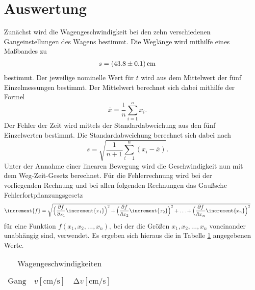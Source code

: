 \section{Auswertung}
\label{sec:Auswertung}

Zunächst wird die Wagengeschwindigkeit bei den zehn verschiedenen Gangeinstellungen des Wagens bestimmt.
Die Weglänge wird mithilfe eines Maßbandes zu
\begin{align*}
  s = \SI{43.8 +- 0.1}{\centi\metre}
\end{align*}
bestimmt.
Der jeweilige nominelle Wert für $t$ wird aus dem Mittelwert der fünf Einzelmessungen bestimmt.
Der Mittelwert berechnet sich dabei mithilfe der Formel
\begin{equation}
 \bar{x} = \frac{1}{n} \sum_{i=1}^n x_i.
\end{equation}
Der Fehler der Zeit wird mittels der Standardabweichung aus den fünf Einzelwerten bestimmt.
Die Standardabweichung berechnet sich dabei nach
\begin{equation}
  s = \sqrt{\frac{1}{n+1} \sum_{i=1}^n (x_i - \bar{x}) }.
\end{equation}
Unter der Annahme einer linearen Bewegung wird die Geschwindigkeit nun mit dem Weg-Zeit-Gesetz berechnet.
Für die Fehlerrechnung wird bei der vorliegenden Rechnung und bei allen folgenden Rechnungen das Gaußsche Fehlerfortpflanzungsgesetz
\begin{equation}
\increment{f} = \sqrt{\Bigl(\frac{\partial f}{\partial x_1}\increment{x_1}\Bigr)^2 + \Bigl(\frac{\partial f}{\partial x_2}\increment{x_2}\Bigr)^2 + \dotsc + \Bigl(\frac{\partial f}{\partial x_n}\increment{x_n}\Bigr)^2}
\end{equation}
für eine Funktion $f(x_1,x_2, \dotsc ,x_n)$, bei der die Größen $x_1, x_2, \dotsc , x_n$ voneinander unabhängig sind, verwendet.
Es ergeben sich hieraus die in Tabelle \ref{tab:Geschwindigkeiten} angegebenen Werte.

\begin{table}[H]
  \centering
  \caption{Wagengeschwindigkeiten}
  \label{tab:Geschwindigkeiten}
  \begin{tabular}{c c c}
    \toprule
    {$\text{Gang}$} & {$v [\si{\centi\metre\per\second}]$} & {$\increment v [\si{\centi\metre\per\second}]$}\\
    \midrule
    
    \bottomrule
  \end{tabular}
\end{table}



